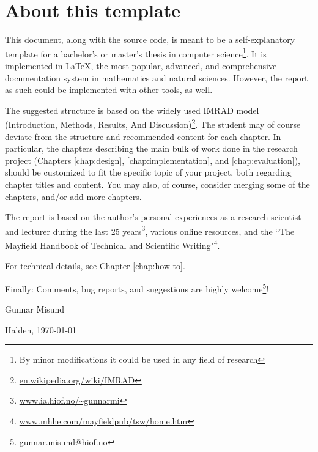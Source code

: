 

\chapter*{About this template}
\label{chap:about}

This document, along with the source code, is meant to be a self-explanatory template for a bachelor's or master's thesis in computer science\footnote{By minor modifications it could be used in any field of research}. It is implemented in \LaTeX, the most popular, advanced, and comprehensive documentation system in mathematics and natural sciences. However, the report as such could be implemented with other tools, as well.

The suggested structure is based on the widely used IMRAD model (Introduction, Methods, Results, And Discussion)\footnote{\url{en.wikipedia.org/wiki/IMRAD}}. The student may of course deviate from the structure and recommended content for each chapter. In particular, the chapters describing the main bulk of work done in the research project (Chapters \ref{chap:design}, \ref{chap:implementation}, and \ref{chap:evaluation}), should be customized to fit the specific topic of your project, both regarding chapter titles and content. You may also, of course, consider merging some of the chapters, and/or add more chapters.

The report is based on the author's personal experiences as a research scientist and lecturer during the last 25 years\footnote{\url{www.ia.hiof.no/~gunnarmi}}, various online resources, 
and the ``The Mayfield Handbook of Technical and Scientific Writing"\cite{perelman97mht}\footnote{\url{www.mhhe.com/mayfieldpub/tsw/home.htm}}.

For technical details, see Chapter \ref{chap:how-to}.

Finally: Comments, bug reports, and suggestions are highly welcome\footnote{\url{gunnar.misund@hiof.no}}!

\vspace{20mm}

Gunnar Misund

Halden, \today



